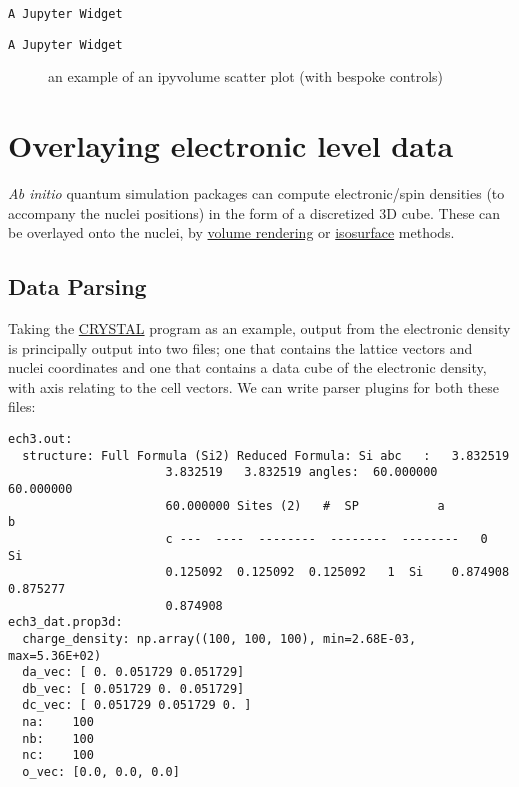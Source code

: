 \documentclass[10pt,parskip=half,
	toc=sectionentrywithdots,
	bibliography=totocnumbered,
	captions=tableheading,numbers=noendperiod]{scrartcl}
\begin{document}
\begin{lstlisting}[language={},postbreak={},numbers=none,xrightmargin=7pt,breakindent=0pt,aboveskip=5pt,belowskip=5pt]
A Jupyter Widget
\end{lstlisting}

\begin{lstlisting}[language={},postbreak={},numbers=none,xrightmargin=7pt,breakindent=0pt,aboveskip=5pt,belowskip=5pt]
A Jupyter Widget
\end{lstlisting}

\begin{figure}[H]\begin{center}\end{center}\caption{an example of an ipyvolume scatter plot (with bespoke controls)}\label{fig:ipyvol2}
    \end{figure}

\section{Overlaying electronic level
data}\label{overlaying-electronic-level-data}

\emph{Ab initio} quantum simulation packages can compute electronic/spin
densities (to accompany the nuclei positions) in the form of a
discretized 3D cube. These can be overlayed onto the nuclei, by
\href{https://en.wikipedia.org/wiki/Volume_rendering}{volume rendering}
or \href{https://en.wikipedia.org/wiki/Isosurface}{isosurface} methods.

\subsection{Data Parsing}\label{data-parsing}

Taking the \href{http://www.crystal.unito.it/index.php}{CRYSTAL} program
as an example, output from the electronic density is principally output
into two files; one that contains the lattice vectors and nuclei
coordinates and one that contains a data cube of the electronic density,
with axis relating to the cell vectors. We can write parser plugins for
both these files:

\begin{lstlisting}[language={},postbreak={},numbers=none,xrightmargin=7pt,belowskip=5pt,aboveskip=5pt,breakindent=0pt]
ech3.out: 
  structure: Full Formula (Si2) Reduced Formula: Si abc   :   3.832519 
                      3.832519   3.832519 angles:  60.000000  60.000000 
                      60.000000 Sites (2)   #  SP           a         b 
                      c ---  ----  --------  --------  --------   0  Si 
                      0.125092  0.125092  0.125092   1  Si    0.874908  0.875277 
                      0.874908
ech3_dat.prop3d: 
  charge_density: np.array((100, 100, 100), min=2.68E-03, max=5.36E+02)
  da_vec: [ 0. 0.051729 0.051729]
  db_vec: [ 0.051729 0. 0.051729]
  dc_vec: [ 0.051729 0.051729 0. ]
  na:    100
  nb:    100
  nc:    100
  o_vec: [0.0, 0.0, 0.0]

\end{lstlisting}
\end{document}
